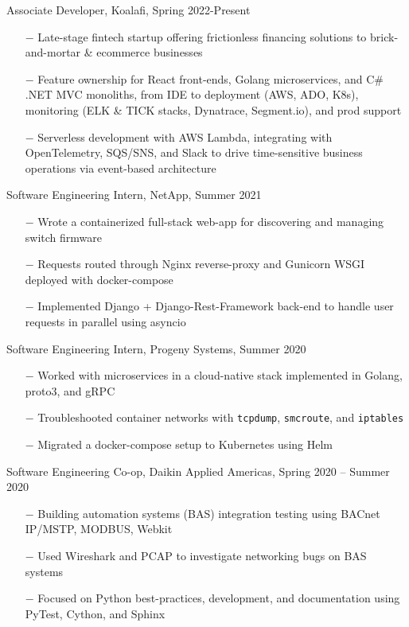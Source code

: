 \documentclass{article}
\newcommand{\code}[1]{\texttt{#1}} %
\begin{document}
{\setlength{\leftskip}{15pt}

{\selectfont Associate Developer, Koalafi, Spring 2022-Present}
\vspace{-5pt}
\begin{itemize}
	\setlength{\leftskip}{15pt}
	\setlength\itemsep{-0.5em}
    \item[$-$] Late-stage fintech startup offering frictionless financing solutions to brick-and-mortar \& ecommerce businesses
    \item[$-$] Feature ownership for React front-ends, Golang microservices, and C\# .NET MVC monoliths, from IDE to deployment (AWS, ADO, K8s), monitoring (ELK \& TICK stacks, Dynatrace, Segment.io), and prod support
    \item[$-$] Serverless development with AWS Lambda, integrating with OpenTelemetry, SQS/SNS, and Slack to drive time-sensitive business operations via event-based architecture
\end{itemize}

{\selectfont Software Engineering Intern, NetApp, Summer 2021}
\vspace{-5pt}
\begin{itemize}
	\setlength{\leftskip}{15pt}
	\setlength\itemsep{-0.5em}
	\item[$-$] Wrote a containerized full-stack web-app for discovering and managing switch firmware
	\item[$-$] Requests routed through Nginx reverse-proxy and Gunicorn WSGI deployed with docker-compose
	\item[$-$] Implemented Django + Django-Rest-Framework back-end to handle user requests in parallel using asyncio
\end{itemize}


{\selectfont Software Engineering Intern, Progeny Systems, Summer 2020}
\vspace{-5pt}
\begin{itemize}
	\setlength{\leftskip}{15pt}
	\setlength\itemsep{-0.5em}
	\item[$-$] Worked with microservices in a cloud-native stack implemented in Golang, proto3, and gRPC 
	\item[$-$] Troubleshooted container networks with \code{tcpdump}, \code{smcroute}, and \code{iptables}
	\item[$-$] Migrated a docker-compose setup to Kubernetes using Helm
\end{itemize}


{\selectfont Software Engineering Co-op, Daikin Applied Americas, Spring 2020 – Summer 2020}
\vspace{-5pt}
\begin{itemize}
	\setlength{\leftskip}{15pt}
	\setlength\itemsep{-0.5em}
	\item[$-$] Building automation systems (BAS) integration testing using BACnet IP/MSTP, MODBUS, Webkit 
	\item[$-$] Used Wireshark and PCAP to investigate networking bugs on BAS systems
	\item[$-$] Focused on Python best-practices, development, and documentation using PyTest, Cython, and Sphinx
\end{itemize}

}
\end{document}
